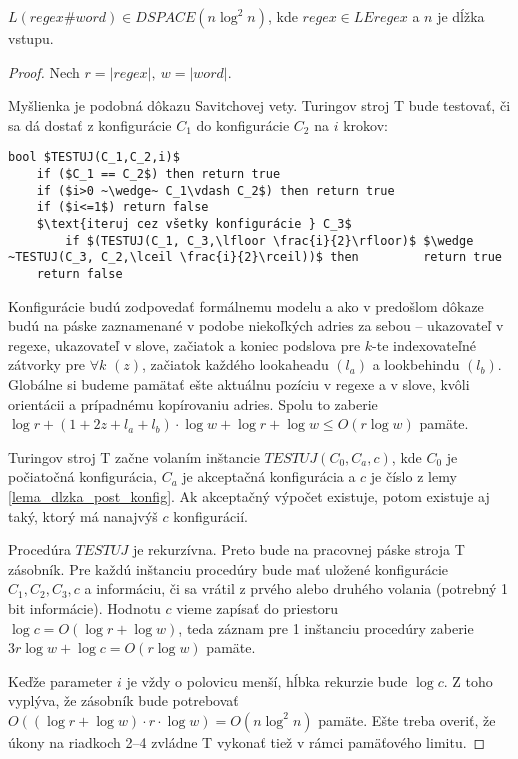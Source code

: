 \documentclass{svk_long_sk}
\def\le{LEregex}
\begin{document}
\begin{theorem}\label{regexword_dspace}
$L(regex\#word) \in DSPACE(n \log^2 n)$, kde $regex \in \le$ a $n$ je dĺžka vstupu.
\end{theorem}
\begin{proof} 
Nech $r=|regex|,~w=|word|$.

Myšlienka je podobná dôkazu Savitchovej vety\cite{Savitch_skripta}. Turingov stroj T bude testovať, či sa dá dostať z konfigurácie $C_1$ do konfigurácie $C_2$ na $i$ krokov:
\begin{lstlisting}[mathescape]
bool $TESTUJ(C_1,C_2,i)$
	if ($C_1 == C_2$) then return true
	if ($i>0 ~\wedge~ C_1\vdash C_2$) then return true
	if ($i<=1$) return false
	$\text{iteruj cez všetky konfigurácie } C_3$
		if $(TESTUJ(C_1, C_3,\lfloor \frac{i}{2}\rfloor)$ $\wedge ~TESTUJ(C_3, C_2,\lceil \frac{i}{2}\rceil))$ then 		return true
	return false
\end{lstlisting}
Konfigurácie budú zodpovedať formálnemu modelu a ako v predošlom dôkaze budú na páske zaznamenané v podobe niekoľkých adries za sebou -- ukazovateľ v regexe, ukazovateľ v slove, začiatok a koniec podslova pre $k$-te indexovateľné zátvorky pre $\forall k$ $(z)$, začiatok každého lookaheadu $(l_a)$ a lookbehindu $(l_b)$. Globálne si budeme pamätať ešte aktuálnu pozíciu v regexe a v slove, kvôli orientácii a prípadnému kopírovaniu adries. Spolu to zaberie $\log r+(1+2z+l_a+l_b)\cdot \log w + \log r+\log w \leq O(r\log w)$ pamäte.

Turingov stroj T začne volaním inštancie $TESTUJ(C_0,C_a,c)$, kde $C_0$ je počiatočná konfigurácia, $C_a$ je akceptačná konfigurácia a $c$ je číslo z lemy \ref{lema_dlzka_post_konfig}. Ak akceptačný výpočet existuje, potom existuje aj taký, ktorý má nanajvýš $c$ konfigurácií.

Procedúra $TESTUJ$ je rekurzívna. Preto bude na pracovnej páske stroja T zásobník. Pre každú inštanciu procedúry bude mať uložené konfigurácie $C_1, C_2, C_3, c$ a informáciu, či sa vrátil z prvého alebo druhého volania (potrebný 1 bit informácie). Hodnotu $c$ vieme zapísať do priestoru $\log c = O(\log r + \log w)$, teda záznam pre 1 inštanciu procedúry zaberie $3r\log w + \log c = O(r\log w)$ pamäte. 

Keďže parameter $i$ je vždy o polovicu menší, hĺbka rekurzie bude $\log c$. Z toho vyplýva, že zásobník bude potrebovať $O((\log r + \log w)\cdot r\cdot \log w) = O(n\log^2n)$ pamäte. Ešte treba overiť, že úkony na riadkoch 2--4 zvládne T vykonať tiež v rámci pamäťového limitu.


\end{proof}
\end{document}
